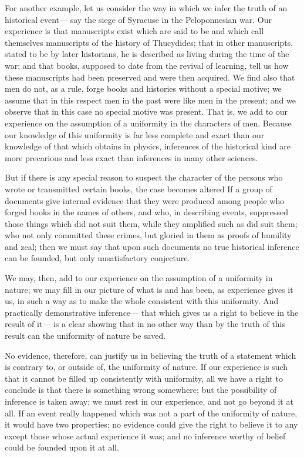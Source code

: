 \documentclass[12pt]{article}
\begin{document}
For another example, let us consider the way in which we infer the truth of an historical event--- say the siege of Syracuse in the Peloponnesian war. Our experience is that manuscripts exist which are said to be and which call themselves manuscripts of the history of Thucydides; that in other manuscripts, stated to be by later historians, he is described as living during the time of the war; and that books, supposed to date from the revival of learning, tell us how these manuscripts had been preserved and were then acquired. We find also that men do not, as a rule, forge books and histories without a special motive; we assume that in this respect men in the past were like men in the present; and we observe that in this case no special motive was present. That is, we add to our experience on the assumption of a uniformity in the characters of men. Because our knowledge of this uniformity is far less complete and exact than our knowledge of that which obtains in physics, inferences of the historical kind are more precarious and less exact than inferences in many other sciences.

But if there is any special reason to suspect the character of the persons who wrote or transmitted certain books, the case becomes altered If a group of documents give internal evidence that they were produced among people who forged books in the names of others, and who, in describing events, suppressed those things which did not suit them, while they amplified such as did suit them; who not only committed these crimes, but gloried in them as proofs of humility and zeal; then we must say that upon such documents no true historical inference can be founded, but only unsatisfactory conjecture.

We may, then, add to our experience on the assumption of a uniformity in nature; we may fill in our picture of what is and has been, as experience gives it us, in such a way as to make the whole consistent with this uniformity. And practically demonstrative inference--- that which gives us a right to believe in the result of it--- is a clear showing that in no other way than by the truth of this result can the uniformity of nature be saved.

No evidence, therefore, can justify us in believing the truth of a statement which is contrary to, or outside of, the uniformity of nature. If our experience is such that it cannot be filled up consistently with uniformity, all we have a right to conclude is that there is something wrong somewhere; but the possibility of inference is taken away; we must rest in our experience, and not go beyond it at all. If an event really happened which was not a part of the uniformity of nature, it would have two properties: no evidence could give the right to believe it to any except those whose actual experience it was; and no inference worthy of belief could be founded upon it at all.
\end{document}
